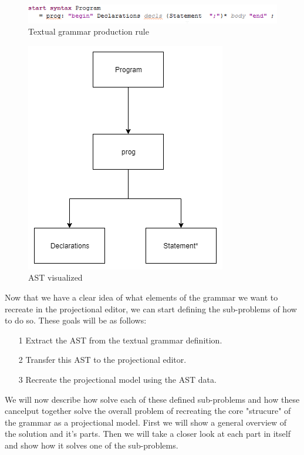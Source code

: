 \documentclass[a4paper]{article}
\begin{document}
\begin{figure}[h]
	\includegraphics[width=\linewidth]{images/StartSyntax2.png}
	\caption{Textual grammar production rule}
	\label{fig:startSyntax}
\end{figure}

\begin{figure}[h]
	\centering
	\includegraphics[scale=0.5]{images/AST.png}
	\caption{AST visualized}
	\label{fig:startSyntaxAST}
\end{figure}

Now that we have a clear idea of what elements of the  grammar we want to recreate in the projectional editor, we can start defining the sub-problems of how to do so. These goals will be as follows:

\begin{itemize}
	\item[1] Extract the AST from the textual grammar definition.
	\item[2] Transfer this AST to the projectional editor.
	\item[3] Recreate the projectional model using the AST data.
\end{itemize}

We will now describe how   solve each of these defined sub-problems and how these cancel{put together} solve the overall problem of recreating the core "strucure" of the grammar as a projectional model.
First we will show a general overview of the solution and it's  parts. Then we will take a closer look at each part in itself and show how it solves one of the sub-problems. 
\end{document}
